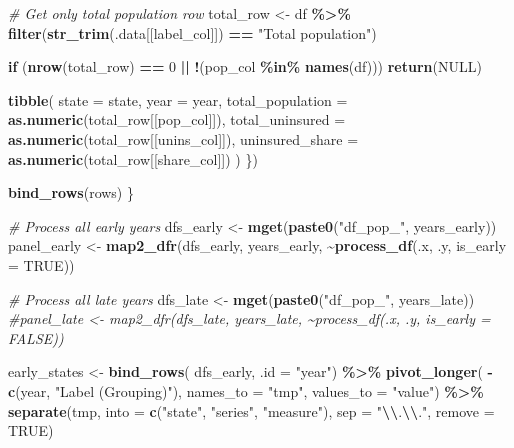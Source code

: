 \documentclass[
]{article}
\newenvironment{Shaded}{\begin{snugshade}}{\end{snugshade}}
\newcommand{\AttributeTok}[1]{\textcolor[rgb]{0.13,0.29,0.53}{#1}}
\newcommand{\CommentTok}[1]{\textcolor[rgb]{0.56,0.35,0.01}{\textit{#1}}}
\newcommand{\ConstantTok}[1]{\textcolor[rgb]{0.56,0.35,0.01}{#1}}
\newcommand{\ControlFlowTok}[1]{\textcolor[rgb]{0.13,0.29,0.53}{\textbf{#1}}}
\newcommand{\DecValTok}[1]{\textcolor[rgb]{0.00,0.00,0.81}{#1}}
\newcommand{\FunctionTok}[1]{\textcolor[rgb]{0.13,0.29,0.53}{\textbf{#1}}}
\newcommand{\NormalTok}[1]{#1}
\newcommand{\OtherTok}[1]{\textcolor[rgb]{0.56,0.35,0.01}{#1}}
\newcommand{\SpecialCharTok}[1]{\textcolor[rgb]{0.81,0.36,0.00}{\textbf{#1}}}
\newcommand{\StringTok}[1]{\textcolor[rgb]{0.31,0.60,0.02}{#1}}
\begin{document}
\begin{Shaded}
\begin{Highlighting}[]
    \CommentTok{\# Get only total population row}
\NormalTok{    total\_row }\OtherTok{\textless{}{-}}\NormalTok{ df }\SpecialCharTok{\%\textgreater{}\%}
      \FunctionTok{filter}\NormalTok{(}\FunctionTok{str\_trim}\NormalTok{(.data[[label\_col]]) }\SpecialCharTok{==} \StringTok{"Total population"}\NormalTok{)}
    
    \ControlFlowTok{if}\NormalTok{ (}\FunctionTok{nrow}\NormalTok{(total\_row) }\SpecialCharTok{==} \DecValTok{0} \SpecialCharTok{||} \SpecialCharTok{!}\NormalTok{(pop\_col }\SpecialCharTok{\%in\%} \FunctionTok{names}\NormalTok{(df))) }\FunctionTok{return}\NormalTok{(}\ConstantTok{NULL}\NormalTok{)}
    
    \FunctionTok{tibble}\NormalTok{(}
      \AttributeTok{state =}\NormalTok{ state,}
      \AttributeTok{year =}\NormalTok{ year,}
      \AttributeTok{total\_population =} \FunctionTok{as.numeric}\NormalTok{(total\_row[[pop\_col]]),}
      \AttributeTok{total\_uninsured =} \FunctionTok{as.numeric}\NormalTok{(total\_row[[unins\_col]]),}
      \AttributeTok{uninsured\_share =} \FunctionTok{as.numeric}\NormalTok{(total\_row[[share\_col]])}
\NormalTok{    )}
\NormalTok{  \})}
  
  \FunctionTok{bind\_rows}\NormalTok{(rows)}
\NormalTok{\}}

\CommentTok{\# Process all early years}
\NormalTok{dfs\_early }\OtherTok{\textless{}{-}} \FunctionTok{mget}\NormalTok{(}\FunctionTok{paste0}\NormalTok{(}\StringTok{"df\_pop\_"}\NormalTok{, years\_early))}
\NormalTok{panel\_early }\OtherTok{\textless{}{-}} \FunctionTok{map2\_dfr}\NormalTok{(dfs\_early, years\_early, }\SpecialCharTok{\textasciitilde{}}\FunctionTok{process\_df}\NormalTok{(.x, .y, }\AttributeTok{is\_early =} \ConstantTok{TRUE}\NormalTok{))}

\CommentTok{\# Process all late years}
\NormalTok{dfs\_late }\OtherTok{\textless{}{-}} \FunctionTok{mget}\NormalTok{(}\FunctionTok{paste0}\NormalTok{(}\StringTok{"df\_pop\_"}\NormalTok{, years\_late))}
\CommentTok{\#panel\_late \textless{}{-} map2\_dfr(dfs\_late, years\_late, \textasciitilde{}process\_df(.x, .y, is\_early = FALSE))}

\NormalTok{early\_states }\OtherTok{\textless{}{-}} \FunctionTok{bind\_rows}\NormalTok{(}
\NormalTok{  dfs\_early, }\AttributeTok{.id =} \StringTok{"year"}\NormalTok{) }\SpecialCharTok{\%\textgreater{}\%}
  \FunctionTok{pivot\_longer}\NormalTok{(}
    \SpecialCharTok{{-}}\FunctionTok{c}\NormalTok{(year, }\StringTok{"Label (Grouping)"}\NormalTok{),}
    \AttributeTok{names\_to =} \StringTok{"tmp"}\NormalTok{,}
    \AttributeTok{values\_to =} \StringTok{"value"}\NormalTok{) }\SpecialCharTok{\%\textgreater{}\%}
  \FunctionTok{separate}\NormalTok{(tmp,}
           \AttributeTok{into =} \FunctionTok{c}\NormalTok{(}\StringTok{"state"}\NormalTok{, }\StringTok{"series"}\NormalTok{, }\StringTok{"measure"}\NormalTok{),}
           \AttributeTok{sep =} \StringTok{"}\SpecialCharTok{\textbackslash{}\textbackslash{}}\StringTok{.}\SpecialCharTok{\textbackslash{}\textbackslash{}}\StringTok{."}\NormalTok{,}
           \AttributeTok{remove =} \ConstantTok{TRUE}\NormalTok{)}
\end{Highlighting}
\end{Shaded}
\end{document}
